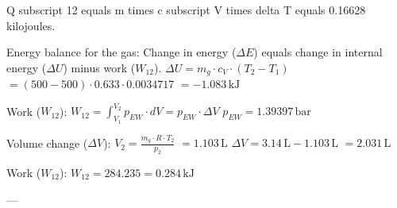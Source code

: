 Q subscript 12 equals m times c subscript V times delta T equals 0.16628 kilojoules.

Energy balance for the gas:  
Change in energy (\( \Delta E \)) equals change in internal energy (\( \Delta U \)) minus work (\( W_{12} \)).  
\( \Delta U = m_g \cdot c_V \cdot (T_2 - T_1) \)  
\( = (500 - 500) \cdot 0.633 \cdot 0.0034717 \)  
\( = -1.083 \, \text{kJ} \)  

Work (\( W_{12} \)):  
\( W_{12} = \int_{V_1}^{V_2} p_{EW} \cdot dV = p_{EW} \cdot \Delta V \)  
\( p_{EW} = 1.39397 \, \text{bar} \)  

Volume change (\( \Delta V \)):  
\( V_2 = \frac{m_g \cdot R \cdot T_2}{p_2} \)  
\( = 1.103 \, \text{L} \)  
\( \Delta V = 3.14 \, \text{L} - 1.103 \, \text{L} \)  
\( = 2.031 \, \text{L} \)  

Work (\( W_{12} \)):  
\( W_{12} = 284.235 = 0.284 \, \text{kJ} \)  

---